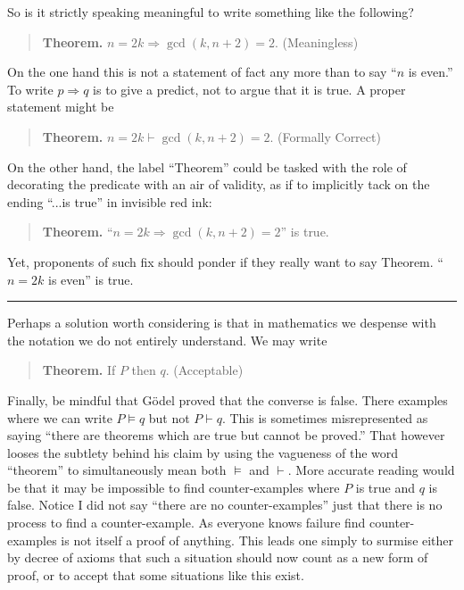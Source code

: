 \begin{remark}
    So is it strictly speaking meaningful to write something like the 
    following? 
    \begin{quote}
        \textbf{Theorem.} $n=2k\Rightarrow \gcd(k,n+2)=2$.
        \hfill{\color{BrickRed} (Meaningless)}
    \end{quote}
    On the one hand this is not a statement of fact any more than 
    to say ``$n$ is even.''  To write $p\Rightarrow q$ is to give 
    a predict, not to argue that it is true.  A proper statement 
    might be 
    \begin{quote}
        \textbf{Theorem.} $n=2k\vdash \gcd(k,n+2)=2$.
        \hfill{\color{BrickRed} (Formally Correct)}
    \end{quote}

    On the other hand, the label ``Theorem'' could be tasked with the 
    role of decorating the predicate with an air of validity, as if 
    to implicitly tack on the ending ``...is true'' in invisible red ink:
    \begin{quote}
        \textbf{Theorem.} ``$n=2k\Rightarrow \gcd(k,n+2)=2$'' {\color{BrickRed} is true.}
    \end{quote}
    Yet, proponents of such fix should ponder if they really want to say
    Theorem. ``$n=2k$ is even'' is true.

    \noindent\rule{\textwidth}{1pt}
    Perhaps a solution worth considering is that in mathematics we 
    despense with the notation we do not entirely understand.  We may write 
    \begin{quote}
        \textbf{Theorem.} If $P$  then $q$.
        \hfill{\color{BrickRed} (Acceptable)}
    \end{quote}
\end{remark}
Finally, be mindful that G\"odel proved that the converse is false.  There
examples where we can write $P\vDash q$ but not $P\vdash q$.   This is sometimes
misrepresented as saying ``there are theorems which are true but cannot be
proved.'' That however looses the subtlety behind his claim by using the
vagueness of the word ``theorem'' to simultaneously mean both $\vDash$ and
$\vdash$.  More accurate reading would be that it may be impossible to find
counter-examples where $P$ is true and $q$ is false. Notice I did not say
``there are no counter-examples'' just that there is no process to find a
counter-example.  As everyone knows failure find counter-examples is not itself
a proof of anything. This leads one simply to surmise either by decree of axioms 
that such a situation should now count as a new form of proof, or to accept that 
some situations like this exist.
